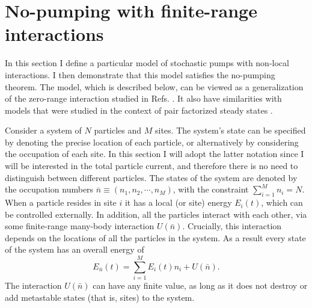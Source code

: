 \documentclass[aps,pre,showpacs,amsmath,amssymb,amsfonts,superscriptaddress,onecolumn,longbibliography]{revtex4-1}
\begin{document}
\section{No-pumping with finite-range interactions}
\label{sec:anal}

In this section I define a particular model of stochastic pumps with non-local interactions. I then demonstrate that this
  model satisfies the no-pumping theorem. The model, which is described below,
can be viewed as a generalization of the zero-range interaction studied
in Refs. \cite{asban_no-pumping_2014,mandal_unification_2014,Asban2015}. It also
have similarities with models that were studied in the context of pair factorized steady states \cite{Evans2006,Waclaw2009}.

Consider a system of $N$ particles and $M$ sites. The system's
state can be specified by denoting the precise location of each particle, or alternatively
by considering the occupation of each site. In this section I will adopt the latter notation since I will be interested
in the total particle current, and therefore there is no need to distinguish between different particles. The states of the system are
denoted by the occupation numbers
$ \bar{n}\equiv \left( n_1,n_2, \cdots , n_M\right)$, with the constraint $\sum_{i=1}^M n_i=N$. When a particle resides
in site $i$ it has a local (or site) energy $E_i (t)$, which can be controlled externally. In addition, all the particles interact
with each other, via some finite-range many-body interaction $U(\bar{n})$. Crucially, this interaction depends on the locations of all the
particles in the system. As a result every state
of the system has an overall energy of
\begin{equation}
E_{\bar{n}}(t)=\sum_{i=1}^M E_i (t) n_i +U(\bar{n}).
\label{eq:defmbenergy}
\end{equation}
The interaction $U(\bar{n})$ can have any finite value, as long as it does not destroy or add metastable states (that is, sites)
to the system.
\end{document}
